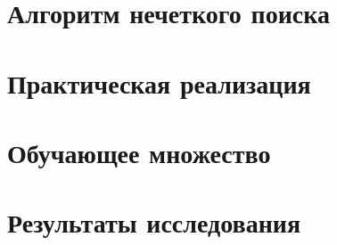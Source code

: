 \documentclass[14pt]{extarticle}
\begin{document}
\section{Алгоритм нечеткого поиска}


\section{Практическая реализация}


\section{Обучающее множество}


\section{Результаты исследования}
\end{document}
